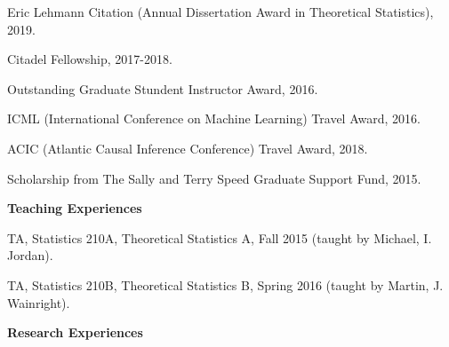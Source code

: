 \documentclass{article}
\begin{document}
\vspace{5mm}

Eric Lehmann Citation (Annual Dissertation Award in Theoretical Statistics), 2019.

\vspace{2mm}

Citadel Fellowship, 2017-2018.

\vspace{2mm}

Outstanding Graduate Stundent Instructor Award, 2016.

\vspace{2mm}
ICML (International Conference on Machine Learning) Travel Award, 2016.

\vspace{2mm}
ACIC (Atlantic Causal Inference Conference) Travel Award, 2018.

\vspace{2mm}
Scholarship from The Sally and Terry Speed Graduate Support Fund, 2015.

\vspace{5mm}
\begin{large}
\noindent \textbf{Teaching Experiences}
\end{large}
\vspace{5mm}

TA, Statistics 210A, Theoretical Statistics A, Fall 2015 (taught by Michael, I. Jordan). 



\vspace{2mm}
TA, Statistics 210B, Theoretical Statistics B, Spring 2016 (taught by Martin, J. Wainright). 




\vspace{5mm}
\begin{large}
\noindent \textbf{Research Experiences}
\end{large}
\vspace{5mm}
\end{document}
